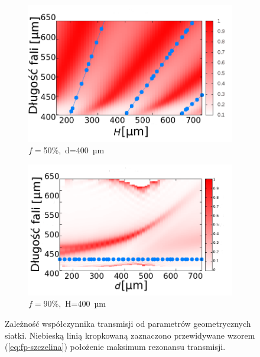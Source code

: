 \begin{figure}[htb]
\begin{subfigure}{0.45\textwidth}
	\includegraphics[width=\textwidth]{images/antenaThz/rezonant_trans_f05.png}
	\caption{$f=$50\%,~d=400~µm }
	\label{fig:rezof05}
\end{subfigure}
\begin{subfigure}{0.45\textwidth}
	\includegraphics[width=\textwidth]{images/antenaThz/rez_trans_L.png}
	\caption{$f=$90\%,~H=400~µm}
	\label{fig:rezL}
\end{subfigure}

\caption{Zależność współczynnika transmisji od parametrów geometrycznych siatki. Niebieską linią kropkowaną zaznaczono przewidywane wzorem (\ref{eq:fp-szczelina}) położenie maksimum rezonansu transmisji. }
\label{fig:wyn-rezo-siat-H}
\end{figure}

